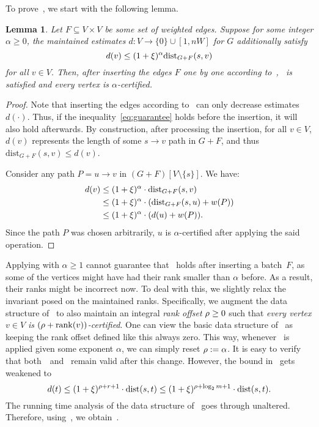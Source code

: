 \documentclass[11pt,letterpaper]{article}
\theoremstyle{plain}
\newtheorem{lemma}[theorem]{Lemma}
\newcommand{\dist}{\mathrm{dist}}
\newcommand{\wei}{w}
\DeclareMathOperator*{\rank}{rank}
\begin{document}
To prove~, we start with the following lemma.
\begin{lemma}\label{l:insert-arbitrary}
  Let $F\subseteq V\times V$ be some set of weighted edges.
  Suppose for some integer $\alpha\geq 0$, the maintained estimates $d:V\to\{0\}\cup [1,nW]$ for $G$ additionally satisfy
  \begin{equation}\label{eq:guarantee}
    d(v)\leq (1+\epsp)^{\alpha}\dist_{G+F}(s,v)
  \end{equation}
  for all $v\in V$. Then, after inserting the edges $F$ one by one according to~,~ is satisfied and
  every vertex is $\alpha$-certified.
\end{lemma}
\begin{proof}
  Note that inserting the edges according to~ can only decrease estimates $d(\cdot)$.
  Thus, if the inequality~\eqref{eq:guarantee} holds before the insertion, it will also hold afterwards.
  By construction, after processing the insertion, for all $v\in V$, $d(v)$ represents
  the length of some $s\to v$ path in $G+F$, and thus $\dist_{G+F}(s,v)\leq d(v)$.

  Consider any path $P=u\to v$ in $(G+F)[V\setminus \{s\}]$. We have:
  \begin{align*}
    d(v)&\leq (1+\epsp)^{\alpha}\cdot \dist_{G+F}(s,v)\\
        &\leq (1+\epsp)^{\alpha} \cdot (\dist_{G+F}(s,u)+\wei(P))\\
        &\leq (1+\epsp)^{\alpha} \cdot (d(u)+\wei(P)).
  \end{align*}
  Since the path $P$ was chosen arbitrarily, $u$ is $\alpha$-certified after applying the said operation.
\end{proof}
Applying  with $\alpha\geq 1$ cannot guarantee that~ holds after inserting a batch~$F$,
as some of the vertices might have had their rank smaller than $\alpha$ before.
As a result, their ranks might be incorrect now.
To deal with this, we slightly relax the invariant posed on the maintained ranks. Specifically, we augment the data structure of~ to also maintain an integral \emph{rank offset} $\rho\geq 0$
such that \emph{every vertex $v\in V$ is $(\roff+\rank(v))$-certified}.
One can view the basic data structure of~ as keeping the rank offset defined like this always zero.
This way, whenever~ is applied given some exponent $\alpha$,
we can simply reset $\rho:=\alpha$.
It is easy to verify that both~~and~ remain valid after this change.
However, the bound in~ gets weakened to
\begin{equation}
  d(t)\leq (1+\epsp)^{\roff+r+1}\cdot\dist(s,t)\leq (1+\epsp)^{\roff+\log_2{m}+1}\cdot \dist(s,t).
\end{equation}
The running time analysis of the data structure of~ goes through unaltered.
Therefore, using~, we obtain~.
\end{document}
